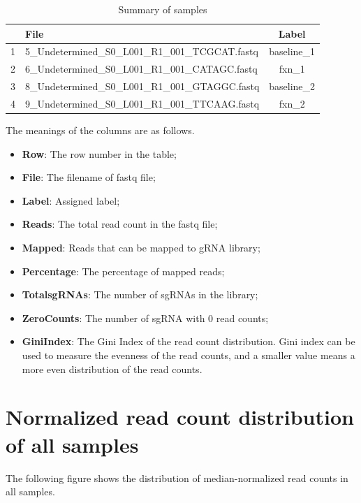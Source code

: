 \documentclass{article}
\begin{document}
\begin{table}[ht]
\centering
\begin{tabular}{cp{9cm}c}
  \hline
 & File & Label \\ 
  \hline
1 & 5\_Undetermined\_S0\_L001\_R1\_001\_TCGCAT.fastq & baseline\_1 \\ 
  2 & 6\_Undetermined\_S0\_L001\_R1\_001\_CATAGC.fastq & fxn\_1 \\ 
  3 & 8\_Undetermined\_S0\_L001\_R1\_001\_GTAGGC.fastq & baseline\_2 \\ 
  4 & 9\_Undetermined\_S0\_L001\_R1\_001\_TTCAAG.fastq & fxn\_2 \\ 
   \hline
\end{tabular}
\caption{Summary of samples} 
\label{tab:three}
\end{table}



The meanings of the columns are as follows.

\begin{itemize}
\item \textbf{Row}: The row number in the table;
\item \textbf{File}: The filename of fastq file;
\item \textbf{Label}: Assigned label;
\item \textbf{Reads}: The total read count in the fastq file;
\item \textbf{Mapped}: Reads that can be mapped to gRNA library;
\item \textbf{Percentage}: The percentage of mapped reads;
\item \textbf{TotalsgRNAs}: The number of sgRNAs in the library; 
\item \textbf{ZeroCounts}: The number of sgRNA with 0 read counts;
\item \textbf{GiniIndex}: The Gini Index of the read count distribution. Gini index can be used to measure the evenness of the read counts, and a smaller value means a more even distribution of the read counts.
\end{itemize}



\newpage\section{Normalized read count distribution of all samples}
The following figure shows the distribution of median-normalized read counts in all samples.
\end{document}
